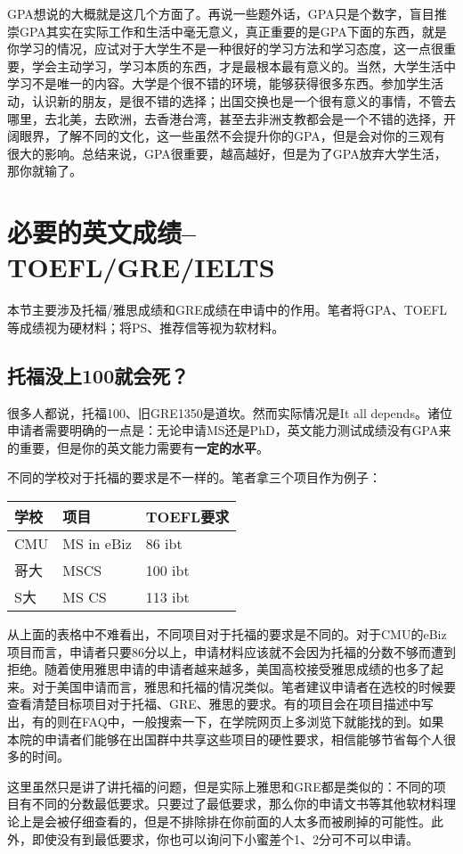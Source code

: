 GPA想说的大概就是这几个方面了。再说一些题外话，GPA只是个数字，盲目推崇GPA其实在实际工作和生活中毫无意义，真正重要的是GPA下面的东西，就是你学习的情况，应试对于大学生不是一种很好的学习方法和学习态度，这一点很重要，学会主动学习，学习本质的东西，才是最根本最有意义的。当然，大学生活中学习不是唯一的内容。大学是个很不错的环境，能够获得很多东西。参加学生活动，认识新的朋友，是很不错的选择；出国交换也是一个很有意义的事情，不管去哪里，去北美，去欧洲，去香港台湾，甚至去非洲支教都会是一个不错的选择，开阔眼界，了解不同的文化，这一些虽然不会提升你的GPA，但是会对你的三观有很大的影响。总结来说，GPA很重要，越高越好，但是为了GPA放弃大学生活，那你就输了。

\section{必要的英文成绩--TOEFL/GRE/IELTS}
本节主要涉及托福/雅思成绩和GRE成绩在申请中的作用。笔者将GPA、TOEFL等成绩视为硬材料；将PS、推荐信等视为软材料。
\subsection{托福没上100就会死？}
很多人都说，托福100、旧GRE1350是道坎。然而实际情况是It all depends。诸位申请者需要明确的一点是：无论申请MS还是PhD，英文能力测试成绩没有GPA来的重要，但是你的英文能力需要有\textbf{一定的水平}。\par
不同的学校对于托福的要求是不一样的。笔者拿三个项目作为例子：
\begin{center}
\begin{tabular}{|l|l|l|}
\hline
学校 & 项目 & TOEFL要求\\ \hline
CMU & MS in eBiz & 86 ibt\\
哥大 & MSCS & 100 ibt\\
S大 & MS CS & 113 ibt\\ \hline
\end{tabular}
\end{center}\par

从上面的表格中不难看出，不同项目对于托福的要求是不同的。对于CMU的eBiz项目而言，申请者只要86分以上，申请材料应该就不会因为托福的分数不够而遭到拒绝。随着使用雅思申请的申请者越来越多，美国高校接受雅思成绩的也多了起来。对于美国申请而言，雅思和托福的情况类似。笔者建议申请者在选校的时候要查看清楚目标项目对于托福、GRE、雅思的要求。有的项目会在项目描述中写出，有的则在FAQ中，一般搜索一下，在学院网页上多浏览下就能找的到。如果本院的申请者们能够在出国群中共享这些项目的硬性要求，相信能够节省每个人很多的时间。\par
这里虽然只是讲了讲托福的问题，但是实际上雅思和GRE都是类似的：不同的项目有不同的分数最低要求。只要过了最低要求，那么你的申请文书等其他软材料理论上是会被仔细查看的，但是不排除排在你前面的人太多而被刷掉的可能性。此外，即使没有到最低要求，你也可以询问下小蜜差个1、2分可不可以申请。\par

